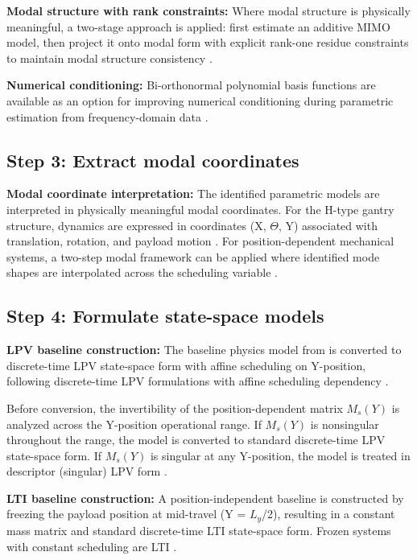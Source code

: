 \textbf{Modal structure with rank constraints:}
Where modal structure is physically meaningful, a two-stage approach is applied: first estimate an additive MIMO model, then project it onto modal form with explicit rank-one residue constraints to maintain modal structure consistency \citep{vanderhulst2025rankone}.

\textbf{Numerical conditioning:}
Bi-orthonormal polynomial basis functions are available as an option for improving numerical conditioning during parametric estimation from frequency-domain data \citep{vanherpen2016biorthonormal}.

\subsection{Step 3: Extract modal coordinates}

\textbf{Modal coordinate interpretation:}
The identified parametric models are interpreted in physically meaningful modal coordinates. For the H-type gantry structure, dynamics are expressed in coordinates (X, $\Theta$, Y) associated with translation, rotation, and payload motion \citep{garcia2013model}. For position-dependent mechanical systems, a two-step modal framework can be applied where identified mode shapes are interpolated across the scheduling variable \citep{voorhoeve2021identifying}.

\subsection{Step 4: Formulate state-space models}

\textbf{LPV baseline construction:}
The baseline physics model from \citet{garcia2013model} is converted to discrete-time LPV state-space form with affine scheduling on Y-position, following discrete-time LPV formulations \citep{toth2010discretization} with affine scheduling dependency \citep{toth2007discrete}. 

Before conversion, the invertibility of the position-dependent matrix $M_s(Y)$ is analyzed across the Y-position operational range. If $M_s(Y)$ is nonsingular throughout the range, the model is converted to standard discrete-time LPV state-space form. If $M_s(Y)$ is singular at any Y-position, the model is treated in descriptor (singular) LPV form \citep{masubuchi2003synthesis, chadli2008stabilisation}.

\textbf{LTI baseline construction:}
A position-independent baseline is constructed by freezing the payload position at mid-travel (Y = $L_y$/2), resulting in a constant mass matrix and standard discrete-time LTI state-space form. Frozen systems with constant scheduling are LTI \citep{toth2010modeling}.

